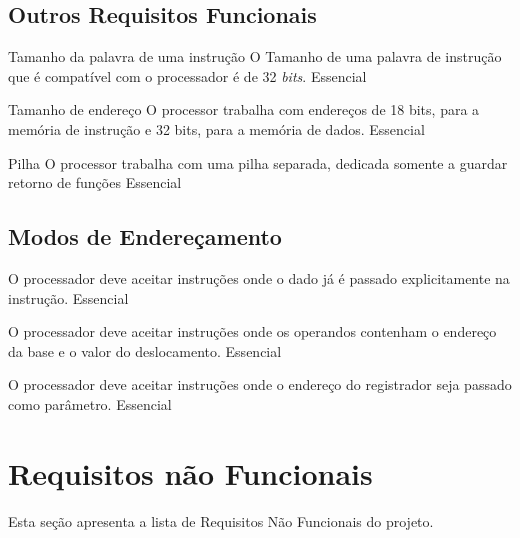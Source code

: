 \documentclass{article}
\begin{document}
	\subsection{Outros Requisitos Funcionais}

    \begin{functional}     
     
     \requirement
      {Tamanho da palavra de uma instrução}
      {O Tamanho de uma palavra de instrução que é compatível com o processador é de 32 \textit{bits}.}
      {Essencial}
      
	\end{functional}
	
	 \begin{functional}     
     
     \requirement
      {Tamanho de endereço}
      {O processor trabalha com endereços de 18 bits, para a memória de instrução e 32 bits, para a memória de dados. }
      {Essencial}
      
	\end{functional}
	
	\begin{functional}     
     
     \requirement
      {Pilha}
      {O processor trabalha com uma pilha separada, dedicada somente a guardar retorno de funções}
      {Essencial}
      
	\end{functional}

	\subsection{Modos de Endereçamento}

	\begin{functional}

      {O processador deve aceitar instruções onde o dado já é passado explicitamente na instrução.}
      {Essencial}

      {O processador deve aceitar instruções onde os operandos contenham o endereço da base e o valor do deslocamento.}
      {Essencial}

      {O processador deve aceitar instruções onde o endereço do registrador seja passado como parâmetro.}
      {Essencial}

     \end{functional}


\section{Requisitos não Funcionais}
Esta seção apresenta a lista de Requisitos Não Funcionais do projeto.
\end{document}
